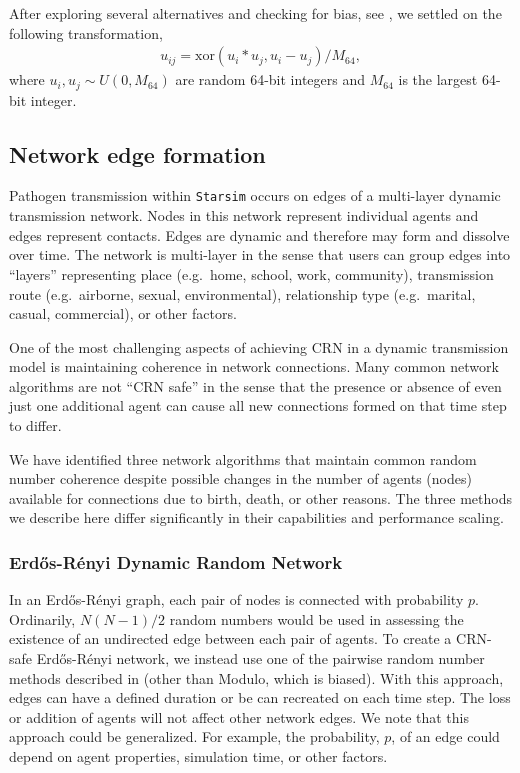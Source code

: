 \documentclass[10pt,letterpaper]{article}
\newcommand{\starsim}{\texttt{Starsim} }
\begin{document}
After exploring several alternatives and checking for bias, see , we settled on the following transformation,
\begin{align}
    u_{ij} = \text{xor}(u_i * u_j, u_i-u_j) / M_{64},
\end{align}
where $u_i, u_j \sim U(0,M_{64})$ are random 64-bit integers and $M_{64}$ is the largest 64-bit integer.

\subsection*{Network edge formation}

Pathogen transmission within \starsim occurs on edges of a multi-layer dynamic transmission network. Nodes in this network represent individual agents and edges represent contacts. Edges are dynamic and therefore may form and dissolve over time. The network is multi-layer in the sense that users can group edges into ``layers'' representing place (e.g.~home, school, work, community), transmission route (e.g.~airborne, sexual, environmental), relationship type (e.g.~marital, casual, commercial), or other factors.

One of the most challenging aspects of achieving CRN in a dynamic transmission model is maintaining coherence in network connections. Many common network algorithms are not ``CRN safe'' in the sense that the presence or absence of even just one additional agent can cause all new connections formed on that time step to differ.

We have identified three network algorithms that maintain common random number coherence despite possible changes in the number of agents (nodes) available for connections due to birth, death, or other reasons. The three methods we describe here differ significantly in their capabilities and performance scaling.

\subsubsection*{Erd{\H o}s-R{\'e}nyi Dynamic Random Network}
In an Erd{\H o}s-R{\'e}nyi graph, each pair of nodes is connected with probability $p$. Ordinarily, $N(N-1)/2$ random numbers would be used in assessing the existence of an undirected edge between each pair of agents. To create a CRN-safe Erd{\H o}s-R{\'e}nyi network, we instead use one of the pairwise random number methods described in  (other than Modulo, which is biased). With this approach, edges can have a defined duration or be can recreated on each time step. The loss or addition of agents will not affect other network edges. We note that this approach could be generalized. For example, the probability, $p$, of an edge could depend on agent properties, simulation time, or other factors.
\end{document}
